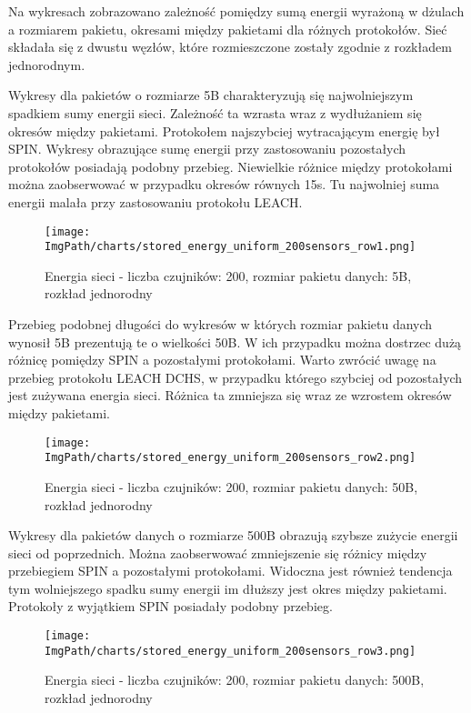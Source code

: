 Na wykresach zobrazowano zależność pomiędzy sumą energii wyrażoną w dżulach a rozmiarem pakietu, okresami między pakietami dla różnych protokołów. Sieć składała się z dwustu węzłów, które rozmieszczone zostały zgodnie z rozkładem jednorodnym.

Wykresy dla pakietów o rozmiarze 5B charakteryzują się najwolniejszym spadkiem sumy energii sieci. Zależność ta wzrasta wraz z wydłużaniem się okresów między pakietami. Protokołem najszybciej wytracającym energię był SPIN. Wykresy obrazujące sumę energii przy zastosowaniu pozostałych protokołów posiadają podobny przebieg. Niewielkie różnice między protokołami można zaobserwować w przypadku okresów równych 15s. Tu najwolniej suma energii malała przy zastosowaniu protokołu LEACH.

\begin{figure}[H]
	\begin{center}
		\texttt{[image: \\ImgPath/charts/stored\_energy\_uniform\_200sensors\_row1.png]}
	\end{center}
	\caption{Energia sieci - liczba czujników: 200, rozmiar pakietu danych: 5B, rozkład jednorodny}
\end{figure}

Przebieg podobnej długości do wykresów w których rozmiar pakietu danych wynosił 5B prezentują te o wielkości 50B. W ich przypadku można dostrzec dużą różnicę pomiędzy SPIN a pozostałymi protokołami.  Warto zwrócić uwagę na przebieg protokołu LEACH DCHS, w przypadku którego szybciej od pozostałych jest zużywana energia sieci. Różnica ta zmniejsza się wraz ze wzrostem okresów między pakietami. 

\begin{figure}[H]
	\begin{center}
		\texttt{[image: \\ImgPath/charts/stored\_energy\_uniform\_200sensors\_row2.png]}
	\end{center}
	\caption{Energia sieci - liczba czujników: 200, rozmiar pakietu danych: 50B, rozkład jednorodny}
\end{figure}

Wykresy dla pakietów danych o rozmiarze 500B obrazują szybsze zużycie energii sieci od poprzednich.  Można zaobserwować zmniejszenie się różnicy między przebiegiem SPIN a pozostałymi protokołami. Widoczna jest również tendencja tym wolniejszego spadku sumy energii im dłuższy jest okres między pakietami. Protokoły z wyjątkiem SPIN  posiadały podobny przebieg.

\begin{figure}[H]
	\begin{center}
		\texttt{[image: \\ImgPath/charts/stored\_energy\_uniform\_200sensors\_row3.png]}
	\end{center}
	\caption{Energia sieci - liczba czujników: 200, rozmiar pakietu danych: 500B, rozkład jednorodny}
\end{figure}

